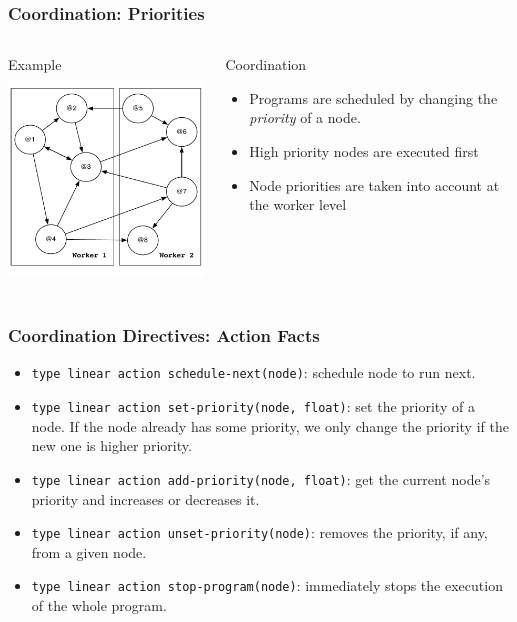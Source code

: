 \documentclass{beamer}
\begin{document}
\begin{frame}[fragile]
   \frametitle{Coordination: Priorities}
   \begin{columns}[t]
          \begin{block}{Example}
             \includegraphics[height=5.5cm]{graph_coordination.pdf}
          \end{block}
          \begin{block}{Coordination}
             {\small
             \begin{itemize}
                \item Programs are scheduled by changing the \emph{priority} of a node.
                \item High priority nodes are executed first
                \item Node priorities are taken into account at the worker level
             \end{itemize}
             }
          \end{block}
   \end{columns}
\end{frame}

\begin{frame}[fragile]
   \frametitle{Coordination Directives: Action Facts}
   \begin{itemize}
      \item \texttt{type linear action schedule-next(node)}: schedule node to run next.
      \item \texttt{type linear action set-priority(node, float)}: set the priority of a node. If the node already has some priority, we only change the priority if the new one is higher priority.
      \item \texttt{type linear action add-priority(node, float)}: get the current node's priority and increases or decreases it.
      \item \texttt{type linear action unset-priority(node)}: removes the priority, if any, from a given node.
      \item \texttt{type linear action stop-program(node)}: immediately stops the execution of the whole program.
   \end{itemize}
\end{frame}
\end{document}
